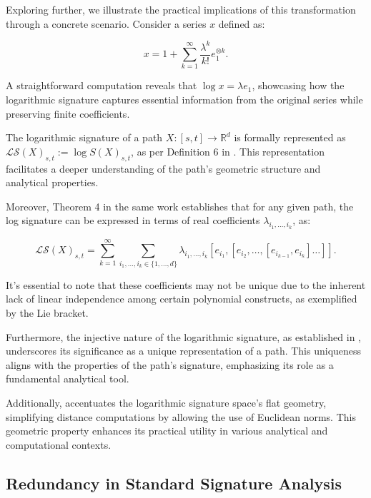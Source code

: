 Exploring further, we illustrate the practical implications of this transformation through a concrete scenario. Consider a series \(x\) defined as:

\begin{equation}
x = 1 + \sum_{k=1}^\infty \frac{\lambda^k}{k!} e_1^{\otimes k}.
\end{equation}

A straightforward computation reveals that \(\log x = \lambda e_1\), showcasing how the logarithmic signature captures essential information from the original series while preserving finite coefficients.

The logarithmic signature of a path \(X : [s, t] \to \mathbb{R}^d\) is formally represented as \(\mathcal{LS}(X)_{s,t} := \log S(X)_{s,t}\), as per Definition 6 in \cite{chevyrevPrimerSignatureMethod2016}. This representation facilitates a deeper understanding of the path's geometric structure and analytical properties.

Moreover, Theorem 4 in the same work establishes that for any given path, the log signature can be expressed in terms of real coefficients \(\lambda_{i_1,\ldots,i_k}\), as:

\begin{equation}
\mathcal{LS}(X)_{s,t} = \sum_{k=1}^\infty \sum_{i_1,\ldots,i_k \in \{1,\ldots,d\}} \lambda_{i_1,\ldots,i_k} [e_{i_1}, [e_{i_2}, \ldots, [e_{i_{k-1}}, e_{i_k}] \ldots]].
\end{equation}

It's essential to note that these coefficients may not be unique due to the inherent lack of linear independence among certain polynomial constructs, as exemplified by the Lie bracket.

Furthermore, the injective nature of the logarithmic signature, as established in \cite{hamblyUniquenessSignaturePath2010}, underscores its significance as a unique representation of a path. This uniqueness aligns with the properties of the path's signature, emphasizing its role as a fundamental analytical tool.

Additionally, \cite{lyonsRoughPathsSignatures2014} accentuates the logarithmic signature space's flat geometry, simplifying distance computations by allowing the use of Euclidean norms. This geometric property enhances its practical utility in various analytical and computational contexts.


\subsection{Redundancy in Standard Signature Analysis}
\label{subsec:redundancy-signature}

